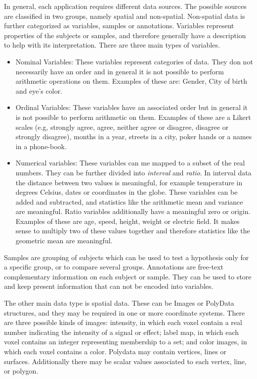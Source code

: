 In general, each application requires different data sources. The possible sources are classified in two groups, namely spatial and non-spatial. Non-spatial data is further categorized as variables, samples or annotations. 
Variables represent properties of the subjects or samples, and therefore generally have a description to help with its interpretation. There are three main types of variables.
\begin{itemize}
\item Nominal Variables: These variables represent categories of data. They don not necessarily have an order and in general it is not possible to perform arithmetic operations on them. Examples of these are: Gender, City of birth and eye's color.
\item Ordinal Variables: These variables have an associated order but in general it is not possible to perform arithmetic on them. Examples of these are a Likert scales (e.g, strongly agree, agree, neither agree or disagree, disagree or strongly disagree), months in a year, streets in a city, poker hands or a names in a phone-book.
\item Numerical variables: These variables can me mapped to a subset of the real numbers. They can be further divided into \emph{interval} and  \emph{ratio}. In interval data the distance between two values is meaningful, for example temperature in degrees Celsius, dates or coordinates in the globe. These variables can be added and subtracted, and statistics like the arithmetic mean and variance are meaningful. Ratio variables additionally have a meaningful zero or origin. Examples of these are age, speed, height, weight or electric field. It makes sense to multiply two of these values together and therefore statistics like the geometric mean are meaningful.
\end{itemize}

Samples are grouping of subjects which can be used to test a hypothesis only for a specific group, or to compare several groups. Annotations are free-text complementary information on each subject or sample. They can be used to store and keep present information that can not be encoded into variables.

The other main data type is  spatial data. These can be Images or PolyData structures, and they may be required in one or more coordinate systems. There are three possible kinds of images: intensity, in which each voxel contain a real number indicating the intensity of a signal or effect; label map, in which each voxel contains an integer representing membership to a set; and color images, in which each voxel contains a color. Polydata may contain vertices, lines or surfaces. Additionally there may be scalar values associated to each vertex, line, or polygon. 

